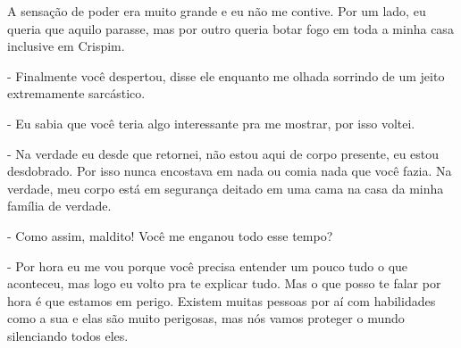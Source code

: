 A sensação de poder era muito grande e eu não me contive. Por um lado, eu queria que aquilo parasse, mas por outro queria botar fogo em toda a minha casa inclusive em Crispim.

- Finalmente você despertou, disse ele enquanto me olhada sorrindo de um jeito extremamente sarcástico.

- Eu sabia que você teria algo interessante pra me mostrar, por isso voltei.

- Na verdade eu desde que retornei, não estou aqui de corpo presente, eu estou desdobrado. Por isso nunca encostava em nada ou comia nada que você fazia. Na verdade, meu corpo está em segurança deitado em uma cama na casa da minha família de verdade.

- Como assim, maldito! Você me enganou todo esse tempo?

- Por hora eu me vou porque você precisa entender um pouco tudo o que aconteceu, mas logo eu volto pra te explicar tudo. Mas o que posso te falar por hora é que estamos em perigo. Existem muitas pessoas por aí com habilidades como a sua e elas são muito perigosas, mas nós vamos proteger o mundo silenciando todos eles.



